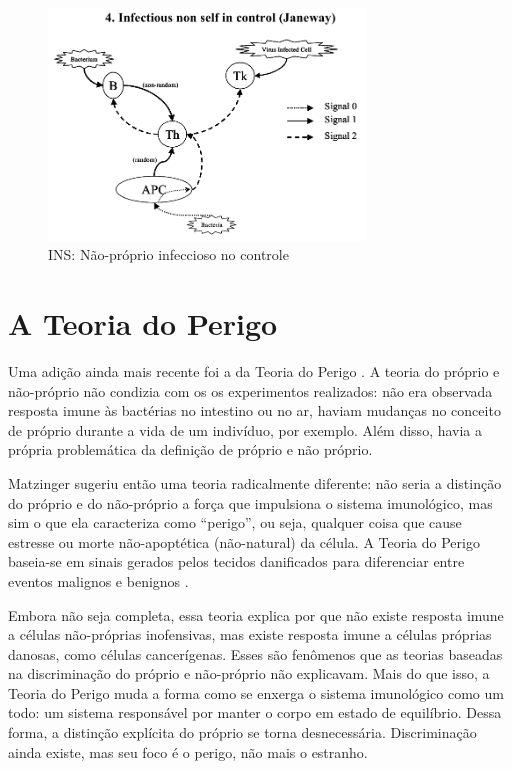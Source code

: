 \begin{figure}[h!]
    \vspace{1cm}
    \centering
    \includegraphics[width=0.75\textwidth]{img/signals4-ins.png}
    \caption{INS: Não-próprio infeccioso no controle \cite{Aickelin2002}}
    \label{fig:nis_nsinf}
    \vspace{1cm}
\end{figure}

\section{A Teoria do Perigo}

Uma adição ainda mais recente foi a da Teoria do Perigo \cite{Matzinger1994}. A teoria do próprio e não-próprio não condizia com os os experimentos realizados: não era observada resposta imune às bactérias no intestino ou no ar, haviam mudanças no conceito de próprio durante a vida de um indivíduo, por exemplo. Além disso, havia a própria problemática da definição de próprio e não próprio.

Matzinger sugeriu então uma teoria radicalmente diferente: não seria a distinção do próprio e do não-próprio a força que impulsiona o sistema imunológico, mas sim o que ela caracteriza como ``perigo'', ou seja, qualquer coisa que cause estresse ou morte não-apoptética (não-natural) da célula. A Teoria do Perigo baseia-se em sinais gerados pelos tecidos danificados para diferenciar entre eventos malignos e benignos \cite{Cayzer2007}.

Embora não seja completa, essa teoria explica por que não existe resposta imune a células não-próprias inofensivas, mas existe resposta imune a células próprias danosas, como células cancerígenas. Esses são fenômenos que as teorias baseadas na discriminação do próprio e não-próprio não explicavam. Mais do que isso, a Teoria do Perigo muda a forma como se enxerga o sistema imunológico como um todo: um sistema responsável por manter o corpo em estado de equilíbrio. Dessa forma, a distinção explícita do próprio se torna desnecessária. Discriminação ainda existe, mas seu foco é o perigo, não mais o estranho.

